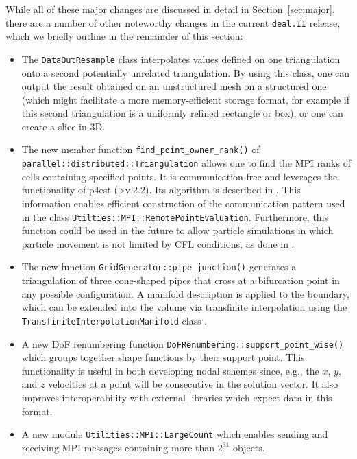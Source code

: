 \documentclass{ansarticle-preprint}
\newcommand{\specialword}[1]{\texttt{#1}}
\newcommand{\dealii}{{\specialword{deal.II}}\xspace}
\begin{document}
While all of these major changes are discussed in detail in
Section~\ref{sec:major}, there
are a number of other noteworthy changes in the current \dealii{} release,
which we briefly outline in the remainder of this section:
%
\begin{itemize}
  \item The \texttt{DataOutResample} class interpolates values defined on one
  triangulation onto a second potentially unrelated triangulation.
  By using this class, one can output the result obtained on an
  unstructured mesh on a structured one (which might facilitate a more
  memory-efficient storage format, for example if this second
  triangulation is a uniformly refined rectangle or box), or one can create a slice in 3D.
  \item The new member function \texttt{find\_point\_owner\_rank()} of
        \texttt{parallel\allowbreak ::distributed::\allowbreak Triangulation} allows one to find the MPI
  ranks of cells containing specified points.
  It is communication-free and leverages the functionality of p4est (>v.2.2).
  Its algorithm is described in \cite{burstedde2020parallel}. This information
  enables efficient construction of the
  communication pattern used in the class \texttt{Utilties::\allowbreak MPI::\allowbreak RemotePointEvaluation}. Furthermore, this function could be used in the future to allow
  particle simulations in which particle movement is not
  limited by CFL conditions, as done in \cite{mirzadeh2016parallel}.
  \item The new function
  \texttt{GridGenerator::pipe\_junction()}
  generates a triangulation of three cone-shaped pipes that cross at a bifurcation point in any possible configuration.
  A manifold description is applied to the boundary, which can be extended into the volume via transfinite interpolation \cite{Gordon82} using the \texttt{TransfiniteInterpolationManifold} class \cite{dealII90}.
  \item A new DoF renumbering function \texttt{DoFRenumbering::support\_point\_wise()} which groups together
  shape functions by their support point. This functionality is useful in both developing nodal schemes since, e.g., the $x$, $y$, and $z$
  velocities at a point will be consecutive in the solution vector. It also improves interoperability with external libraries which expect
  data in this format.
  \item A new module \texttt{Utilities::MPI::LargeCount} which enables sending and receiving MPI messages containing more than $2^31$ objects.

\end{itemize}
\end{document}
